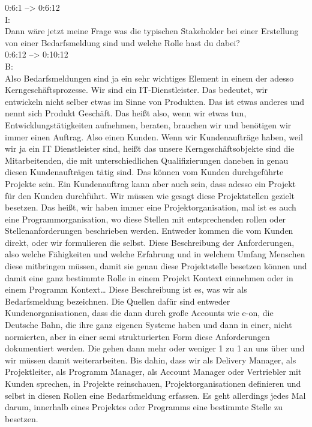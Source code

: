 0:6:1 --> 0:6:12\\
I:\\
Dann wäre jetzt meine Frage was die typischen Stakeholder bei einer Erstellung von einer Bedarfsmeldung sind und welche Rolle hast du dabei?\\

0:6:12 --> 0:10:12\\
B:\\
Also Bedarfsmeldungen sind ja ein sehr wichtiges Element in einem der adesso Kerngeschäftsprozesse. Wir sind ein IT-Dienstleister. Das bedeutet, wir entwickeln nicht selber etwas im Sinne von Produkten. Das ist etwas anderes und nennt sich Produkt Geschäft. Das heißt also, wenn wir etwas tun, Entwicklungstätigkeiten aufnehmen, beraten, brauchen wir und benötigen wir immer einen Auftrag. Also einen Kunden. Wenn wir Kundenaufträge haben, weil wir ja ein IT Dienstleister sind, heißt das unsere Kerngeschäftsobjekte sind die Mitarbeitenden, die mit unterschiedlichen Qualifizierungen daneben in genau diesen Kundenaufträgen tätig sind. Das können vom Kunden durchgeführte Projekte sein. Ein Kundenauftrag kann aber auch sein, dass adesso ein Projekt für den Kunden durchführt. Wir müssen wie gesagt diese Projektstellen gezielt besetzen. Das heißt, wir haben immer eine Projektorganisation, mal ist es auch eine Programmorganisation, wo diese Stellen mit entsprechenden rollen oder Stellenanforderungen beschrieben werden. Entweder kommen die vom Kunden direkt, oder wir formulieren die selbst. Diese Beschreibung der Anforderungen, also welche Fähigkeiten und welche Erfahrung und in welchem Umfang Menschen diese mitbringen müssen, damit sie genau diese Projektstelle besetzen können und damit eine ganz bestimmte Rolle in einem Projekt Kontext einnehmen oder in einem Programm Kontext… Diese Beschreibung ist es, was wir als Bedarfsmeldung bezeichnen. Die Quellen dafür sind entweder Kundenorganisationen, dass die dann durch große Accounts wie e-on, die Deutsche Bahn, die ihre ganz eigenen Systeme haben und dann in einer, nicht normierten, aber in einer semi strukturierten Form diese Anforderungen dokumentiert werden. Die gehen dann mehr oder weniger 1 zu 1 an uns über und wir müssen damit weiterarbeiten. Bis dahin, dass wir als Delivery Manager, als Projektleiter, als Programm Manager, als Account Manager oder Vertriebler mit Kunden sprechen, in Projekte reinschauen, Projektorganisationen definieren und selbst in diesen Rollen eine Bedarfsmeldung erfassen. Es geht allerdings jedes Mal darum, innerhalb eines Projektes oder Programms eine bestimmte Stelle zu besetzen.\\

